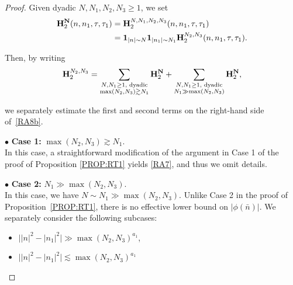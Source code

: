 \documentclass[%
11pt,  reqno]{amsart}
\newcommand{\1}{\hspace{0.2mm}\text{I}\hspace{0.2mm}}
\newcommand{\noi}{\noindent}
\newcommand{\les}{\lesssim}
\newcommand{\ges}{\gtrsim}
\newcommand{\ind}{\mathbf 1}
\numberwithin{equation}{section}
\numberwithin{theorem}{section}
\newcommand{\Hb}{\mathbf{H}}
\begin{document}
\begin{proof}
Given dyadic $N, N_1, N_2, N_3 \ge 1$, we set 
\begin{align*}
 \Hb_2^{{\bf N}} (n,n_1,\tau, \tau_1)  
& = \Hb_2^{N, N_1, N_2,  N_3} (n,n_1,\tau, \tau_1)  \\
& = \ind_{|n|\sim N} \ind_{|n_1|\sim N_1}
\Hb_2^{N_2, N_3} (n,n_1,\tau, \tau_1).
\end{align*}

\noi
Then, by writing 
\begin{align}
\Hb_2^{N_2, N_3}
= 
\sum_{\substack{N, N_1 \ge 1, \text{ dyadic}\\ \max (N_2, N_3) \ges N_1}} 
\Hb_2^{\bf N}
+ 
\sum_{\substack{N, N_1 \ge 1, \text{ dyadic}\\ N_1 \gg \max (N_2, N_3)}} 
\Hb_2^{\bf N}, 
\label{RA8b}
\end{align}


\noi
 we separately estimate
the first and second terms on the right-hand side of~\eqref{RA8b}.


\medskip

\noi 
$\bullet$ {\bf Case 1:}
 $\max (N_2, N_3) \ges N_1$. 
\\
\indent
In this case, a straightforward modification of the argument in 
Case 1 of  the proof of Proposition \ref{PROP:RT1}
yields \eqref{RA7}, and thus we omit details.





\medskip

\noi 
$\bullet$ {\bf Case 2:}
 $N_1 \gg \max (N_2, N_3)$. 
\\
\indent
In this case, we have $N \sim N_1
\gg \max (N_2, N_3)$.
Unlike Case 2 in the proof of Proposition~\ref{PROP:RT1}, 
there is no effective lower bound on $|\phi(\bar n)|$.
We separately consider the following subcases:

\smallskip


\begin{itemize}
\item[(2.a)]
$\big| |n|^2 - |n_1|^2 \big| \gg \max (N_2, N_3)^{a_1}$, 


\smallskip

\item[(2.b)]
$\big| |n|^2 - |n_1|^2 \big| \les \max (N_2, N_3)^{a_1}$


\end{itemize}

\smallskip


\end{proof}
\end{document}
